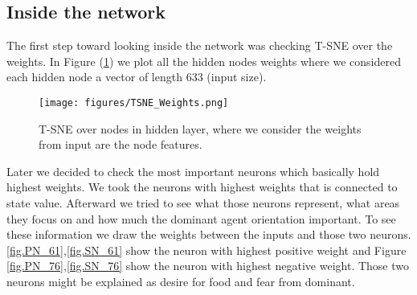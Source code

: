 \documentclass{article}
\begin{document}
\subsection{Inside the network}
The first step toward looking inside the network was checking T-SNE over the weights. In Figure (\ref{fig.TSNE_Weights}) we plot all the hidden nodes weights where we considered each hidden node a vector of length 633 (input size).
\begin{figure}[H]
\texttt{[image: figures/TSNE\_Weights.png]}
\caption{T-SNE over nodes in hidden layer, where we consider the weights from input are the node features.}
\label{fig.TSNE_Weights}
\end{figure}

Later we decided to check the most important neurons which basically hold highest weights. We took the neurons with highest weights that is connected to state value. Afterward we tried to see what those neurons represent, what areas they focus on and how much the dominant agent orientation important. To see these information we draw the weights between the inputs and those two neurons. \ref{fig.PN_61},\ref{fig.SN_61} show the neuron with highest positive weight and Figure \ref{fig.PN_76},\ref{fig.SN_76} show the neuron with highest negative weight. Those two neurons might be explained as desire for food and fear from dominant. 
\end{document}
